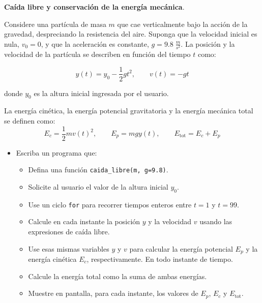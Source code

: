 \item \textbf{Caída libre y conservación de la energía mecánica}.

\begin{tcolorbox}[colback=blue!2!white,colframe=blue!55!black,title={Enunciado}]

	Considere una partícula de masa \(m\) que cae verticalmente bajo la acción de la gravedad, despreciando la resistencia del aire. Suponga que la velocidad inicial es nula, \(v_0 = 0\), y que la aceleración es constante, \(g = 9.8 \; \frac{m}{s^2}\). La posición y la velocidad de la partícula se describen en función del tiempo \(t\) como:

\[
y(t) = y_0 - \frac{1}{2}gt^2,
\qquad
v(t) = -gt
\]

donde \(y_0\) es la altura inicial ingresada por el usuario.

La energía cinética, la energía potencial gravitatoria y la energía mecánica total se definen como:
\[
E_c = \frac{1}{2}mv(t)^2,
\qquad
E_p = mgy(t),
\qquad
E_{\text{tot}} = E_c + E_p
\]

\begin{itemize}
    \item Escriba un programa que:
    \begin{itemize}
        \item Defina una función \texttt{caida\_libre(m, g=9.8)}.
        \item Solicite al usuario el valor de la altura inicial \(y_0\).
        \item Use un ciclo \texttt{for} para recorrer tiempos enteros entre \(t=1\) y \(t=99\).
        \item Calcule en cada instante la posición \(y\) y la velocidad \(v\) usando las expresiones de caída libre.
        \item Use esas mismas variables \(y\) y \(v\) para calcular la energía potencial \(E_p\) y la energía cinética \(E_c\), respectivamente. En todo instante de tiempo.
        \item Calcule la energía total como la suma de ambas energías.
        \item Muestre en pantalla, para cada instante, los valores de \(E_p\), \(E_c\) y \(E_{\text{tot}}\).
    \end{itemize}
\end{itemize}
\end{tcolorbox}

